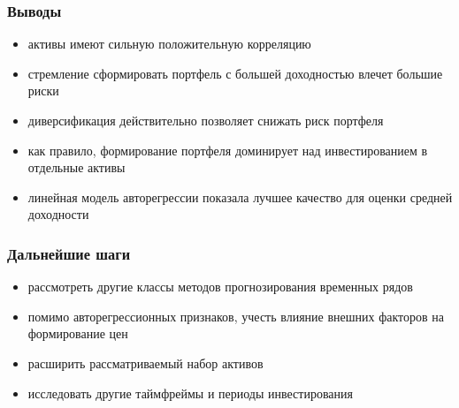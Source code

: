 \documentclass{beamer}
\begin{document}
\begin{frame}
    \frametitle{Выводы}
    \begin{itemize}
        \item активы имеют сильную положительную корреляцию
        \item стремление сформировать портфель с большей доходностью влечет большие риски
        \item диверсификация действительно позволяет снижать риск портфеля
        \item как правило, формирование портфеля доминирует над инвестированием в отдельные активы
        \item линейная модель авторегрессии показала лучшее качество для оценки средней доходности
    \end{itemize}
\end{frame}

\begin{frame}
    \frametitle{Дальнейшие шаги}
    \begin{itemize}
        \item рассмотреть другие классы методов прогнозирования временных рядов
        \item помимо авторегрессионных признаков, учесть влияние внешних факторов на формирование цен
        \item расширить рассматриваемый набор активов
        \item исследовать другие таймфреймы и периоды инвестирования
    \end{itemize}
\end{frame}
\end{document}
